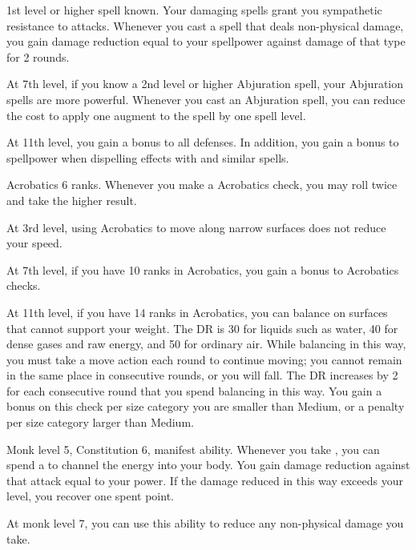     \featpre 1st level or higher  spell known.
    \featben Your damaging spells grant you sympathetic resistance to attacks.
    Whenever you cast a spell that deals non-physical damage, you gain damage reduction equal to your spellpower against damage of that type for 2 rounds.

    At 7th level, if you know a 2nd level or higher Abjuration spell, your Abjuration spells are more powerful.
    Whenever you cast an Abjuration spell, you can reduce the cost to apply one augment to the spell by one spell level.

    At 11th level, you gain a  bonus to all defenses.
    In addition, you gain a  bonus to spellpower when dispelling effects with  and similar spells.

    \featpre Acrobatics 6 ranks.
    \featben Whenever you make a Acrobatics check, you may roll twice and take the higher result.

    At 3rd level, using Acrobatics to move along narrow surfaces does not reduce your speed.

    At 7th level, if you have 10 ranks in Acrobatics, you gain a  bonus to Acrobatics checks.

    At 11th level, if you have 14 ranks in Acrobatics, you can balance on surfaces that cannot support your weight.
    The DR is 30 for liquids such as water, 40 for dense gases and raw energy, and 50 for ordinary air.
    While balancing in this way, you must take a move action each round to continue moving; you cannot remain in the same place in consecutive rounds, or you will fall.
    The DR increases by 2 for each consecutive round that you spend balancing in this way.
    You gain a  bonus on this check per size category you are smaller than Medium, or a  penalty per size category larger than Medium.
    \magical

    \featpres Monk level 5, Constitution 6, manifest \ki ability.
    \featben Whenever you take , you can spend a  to channel the energy into your body.
    You gain damage reduction against that attack equal to your \ki power.
    If the damage reduced in this way exceeds your level, you recover one spent \ki point.

    At monk level 7, you can use this ability to reduce any non-physical damage you take.


